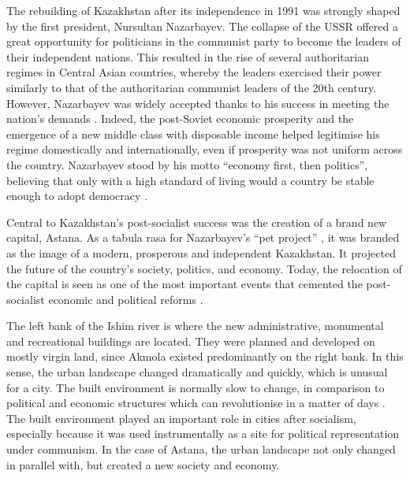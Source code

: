 \documentclass{article}
\begin{document}
The rebuilding of Kazakhstan after its independence in 1991 was strongly shaped by the first president, Nursultan Nazarbayev. The collapse of the USSR offered a great opportunity for politicians in the communist party to become the leaders of their independent nations. This resulted in the rise of several authoritarian regimes in Central Asian countries, whereby the leaders exercised their power similarly to that of the authoritarian communist leaders of the 20th century. However, Nazarbayev was widely accepted thanks to his success in meeting the nation's demands \parencite{isaacs2010papa}. Indeed, the post-Soviet economic prosperity and the emergence of a new middle class with disposable income helped legitimise his regime  domestically and internationally, even if prosperity was not uniform across the country. Nazarbayev stood by his motto ``economy first, then politics'', believing that only with a high standard of living would a country be stable enough to adopt democracy \parencite{kassymbekov_2020}.

Central to Kazakhstan's post-socialist success was the creation of a brand new capital, Astana. As a tabula rasa for Nazarbayev's ``pet project'' \parencite{koch2010monumental}, it was branded as the image of a modern, prosperous and independent Kazakhstan. It projected the future of the country's society, politics, and economy. Today, the relocation of the capital is seen as one of the most important events that cemented the post-socialist economic and political reforms \parencite{kassymbekov_2020}.

The left bank of the Ishim river is where the new administrative, monumental and recreational buildings are located. They were planned and developed on mostly virgin land, since Akmola existed predominantly on the right bank. In this sense, the urban landscape changed dramatically and quickly, which is unusual for a city. The built environment is normally slow to change, in comparison to political and economic structures which can revolutionise in a matter of days \parencite{stanilov2007post}. The built environment played an important role in cities after socialism, especially because it was used instrumentally as a site for political representation under communism. In the case of Astana, the urban landscape not only changed in parallel with, but created a new society and economy. 
\end{document}
